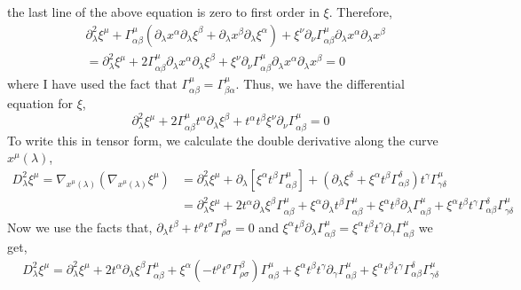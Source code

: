 \documentclass[11pt, a4paper]{article}
\begin{document}
the last line of the above equation is zero to first order in $\xi$.  
Therefore, 
\begin{align*} 
& \partial_\lambda^2 \xi^\mu + \Gamma^\mu_{\alpha\beta}\left(\partial_\lambda x^\alpha \partial_\lambda \xi^\beta + \partial_\lambda x^\beta \partial_\lambda \xi^\alpha\right) + \xi^\nu \partial_\nu\Gamma^\mu_{\alpha\beta} \partial_\lambda x^\alpha \partial_\lambda x^\beta  
\\
& = 
\partial_\lambda^2 \xi^\mu + 2 \Gamma^\mu_{\alpha\beta} \partial_\lambda x^\alpha \partial_\lambda \xi^\beta  + \xi^\nu \partial_\nu\Gamma^\mu_{\alpha\beta} \partial_\lambda x^\alpha \partial_\lambda x^\beta = 0 
\end{align*}
where I have used the fact that $\Gamma^\mu_{\alpha \beta} = \Gamma^\mu_{\beta \alpha}$. Thus, we have the differential equation for $\xi$,
\[\partial_\lambda^2 \xi^\mu + 2 \Gamma^\mu_{\alpha\beta} t^\alpha \partial_\lambda \xi^\beta + t^\alpha t^\beta \xi^\nu \partial_\nu\Gamma^\mu_{\alpha\beta} = 0\]
To write this in tensor form, we calculate the double derivative along the curve $x^\mu(\lambda)$, 
\begin{align*}
D_\lambda^2 \xi^\mu = \nabla_{x^\mu(\lambda)}\left(\nabla_{x^\mu(\lambda)}\xi^\mu\right) & = \partial_\lambda^2\xi^\mu + \partial_\lambda\left[\xi^\alpha t^\beta \Gamma^\mu_{\alpha\beta}\right] + \left(\partial_\lambda \xi^\delta + \xi^\alpha t^\beta \Gamma^\delta_{\alpha\beta}\right) t^\gamma\Gamma^\mu_{\gamma\delta}
\\
& = \partial_\lambda^2 \xi^\mu + 2t^\alpha \partial_\lambda \xi^\beta \Gamma^\mu_{\alpha\beta} + \xi^\alpha \partial_\lambda t^\beta \Gamma^\mu_{\alpha\beta} + \xi^\alpha t^\beta \partial_\lambda \Gamma^\mu_{\alpha \beta} + \xi^\alpha t^\beta t^\gamma \Gamma^\delta_{\alpha\beta}\Gamma^\mu_{\gamma \delta}
\end{align*}
Now we use the facts that, $\partial_\lambda t^\beta + t^\rho t^\sigma \Gamma^\beta_{\rho\sigma} = 0$ and $\xi^\alpha t^\beta \partial_\lambda \Gamma^\mu_{\alpha \beta} = \xi^\alpha t^\beta t^\gamma \partial_\gamma \Gamma^\mu_{\alpha \beta}$ we get,
\begin{align*}
D_\lambda^2 \xi^\mu = \partial_\lambda^2 \xi^\mu + 2t^\alpha \partial_\lambda \xi^\beta \Gamma^\mu_{\alpha\beta} + \xi^\alpha \left( - t^\rho t^\sigma \Gamma_{\rho \sigma}^\beta \right) \Gamma^\mu_{\alpha\beta} + \xi^\alpha t^\beta t^\gamma \partial_\gamma \Gamma^\mu_{\alpha \beta} + \xi^\alpha t^\beta t^\gamma \Gamma^\delta_{\alpha\beta}\Gamma^\mu_{\gamma \delta}
\end{align*}
\end{document}
